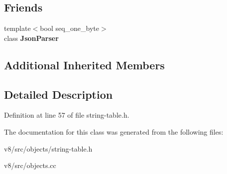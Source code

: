 \subsection*{Friends}
\begin{DoxyCompactItemize}
\item 
\mbox{\label{classv8_1_1internal_1_1StringTable_a9f71fbaae144c73b8be1f30630fdb8da}} 
{\footnotesize template$<$bool seq\+\_\+one\+\_\+byte$>$ }\\class {\bfseries Json\+Parser}
\end{DoxyCompactItemize}
\subsection*{Additional Inherited Members}


\subsection{Detailed Description}


Definition at line 57 of file string-\/table.\+h.



The documentation for this class was generated from the following files\+:\begin{DoxyCompactItemize}
\item 
v8/src/objects/string-\/table.\+h\item 
v8/src/objects.\+cc\end{DoxyCompactItemize}
